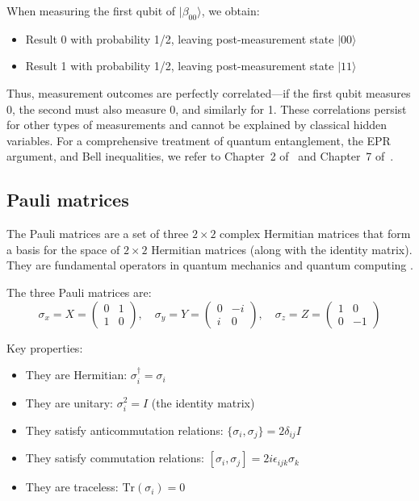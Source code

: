 \documentclass[a4paper,12pt]{amsart}
\begin{document}
When measuring the first qubit of $|\beta_{00}\rangle$, we obtain:
\begin{itemize}
    \item Result 0 with probability 1/2, leaving post-measurement state $|00\rangle$
    \item Result 1 with probability 1/2, leaving post-measurement state $|11\rangle$
\end{itemize}

Thus, measurement outcomes are perfectly correlated—if the first qubit measures 0, the second must also measure 0, and similarly for 1. These correlations persist for other types of measurements and cannot be explained by classical hidden variables. For a comprehensive treatment of quantum entanglement, the EPR argument, and Bell inequalities, we refer to Chapter~2 of~\cite{nielsen2011quantum} and Chapter~7 of~\cite{yanofsky2008quantum}.


\subsection{Pauli matrices}
The Pauli matrices are a set of three $2 \times 2$ complex Hermitian matrices that form a basis for the space of $2 \times 2$ Hermitian matrices (along with the identity matrix). They are fundamental operators in quantum mechanics and quantum computing \cite{nielsen2011quantum, scherer2019mathematics}.

The three Pauli matrices are:
\begin{equation}
\sigma_x = X = \begin{pmatrix} 0 & 1 \\ 1 & 0 \end{pmatrix}, \quad
\sigma_y = Y = \begin{pmatrix} 0 & -i \\ i & 0 \end{pmatrix}, \quad
\sigma_z = Z = \begin{pmatrix} 1 & 0 \\ 0 & -1 \end{pmatrix}
\end{equation}

Key properties:
\begin{itemize}
\item They are Hermitian: $\sigma_i^\dagger = \sigma_i$
\item They are unitary: $\sigma_i^2 = I$ (the identity matrix)
\item They satisfy anticommutation relations: $\{\sigma_i, \sigma_j\} = 2\delta_{ij}I$
\item They satisfy commutation relations: $[\sigma_i, \sigma_j] = 2i\epsilon_{ijk}\sigma_k$
\item They are traceless: $\text{Tr}(\sigma_i) = 0$
\end{itemize}
\end{document}
